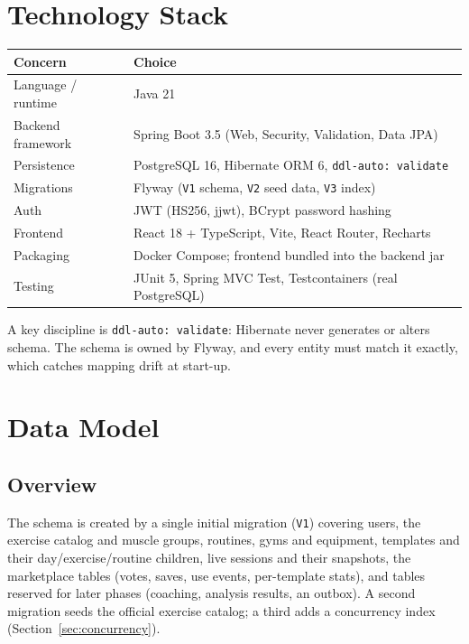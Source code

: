 \documentclass[11pt,a4paper]{article}
\begin{document}
\section{Technology Stack}
\begin{center}
\begin{tabular}{@{}ll@{}}
\toprule
Concern & Choice \\
\midrule
Language / runtime & Java 21 \\
Backend framework & Spring Boot 3.5 (Web, Security, Validation, Data JPA) \\
Persistence & PostgreSQL 16, Hibernate ORM 6, \verb|ddl-auto: validate| \\
Migrations & Flyway (\verb|V1| schema, \verb|V2| seed data, \verb|V3| index) \\
Auth & JWT (HS256, jjwt), BCrypt password hashing \\
Frontend & React 18 + TypeScript, Vite, React Router, Recharts \\
Packaging & Docker Compose; frontend bundled into the backend jar \\
Testing & JUnit 5, Spring MVC Test, Testcontainers (real PostgreSQL) \\
\bottomrule
\end{tabular}
\end{center}

\noindent A key discipline is \verb|ddl-auto: validate|: Hibernate never generates or alters
schema. The schema is owned by Flyway, and every entity must match it exactly, which catches
mapping drift at start-up.

\section{Data Model}

\subsection{Overview}
The schema is created by a single initial migration (\verb|V1|) covering users, the exercise
catalog and muscle groups, routines, gyms and equipment, templates and their day/exercise/routine
children, live sessions and their snapshots, the marketplace tables (votes, saves, use events,
per-template stats), and tables reserved for later phases (coaching, analysis results, an outbox).
A second migration seeds the official exercise catalog; a third adds a concurrency index
(Section~\ref{sec:concurrency}).
\end{document}
